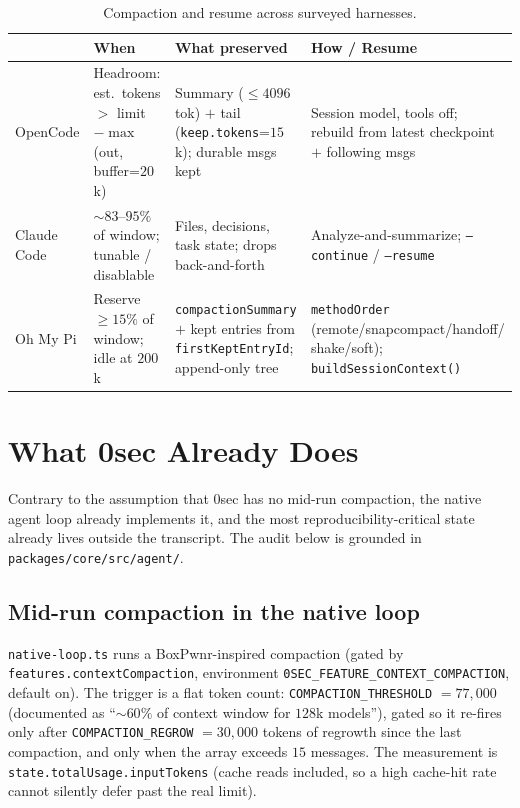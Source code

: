 \documentclass[11pt]{article}
\begin{document}
\begin{table}[t]
\centering
\small
\begin{tabular}{@{}p{2.0cm}p{3.4cm}p{3.4cm}p{3.4cm}@{}}
\toprule
 & \textbf{When} & \textbf{What preserved} & \textbf{How / Resume} \\
\midrule
OpenCode &
Headroom: est.\ tokens $>$ limit $-\max$(out, buffer=$20$k) &
Summary ($\le 4096$ tok) $+$ tail (\texttt{keep.tokens}=$15$k); durable msgs kept &
Session model, tools off; rebuild from latest checkpoint $+$ following msgs \\
\addlinespace
Claude Code &
$\sim 83$--$95\%$ of window; tunable / disablable &
Files, decisions, task state; drops back-and-forth &
Analyze-and-summarize; \texttt{--continue} / \texttt{--resume} \\
\addlinespace
Oh My Pi &
Reserve $\ge 15\%$ of window; idle at $200$k &
\texttt{compactionSummary} $+$ kept entries from \texttt{firstKeptEntryId}; append-only tree &
\texttt{methodOrder} (remote/snapcompact/handoff/ shake/soft); \texttt{buildSessionContext()} \\
\bottomrule
\end{tabular}
\caption{Compaction and resume across surveyed harnesses.}
\label{tab:survey}
\end{table}

\section{What 0sec Already Does}

Contrary to the assumption that 0sec has no mid-run compaction, the native agent
loop already implements it, and the most reproducibility-critical state already
lives outside the transcript. The audit below is grounded in
\texttt{packages/core/src/agent/}.

\subsection{Mid-run compaction in the native loop}

\texttt{native-loop.ts} runs a BoxPwnr-inspired compaction (gated by
\texttt{features.contextCompaction}, environment
\texttt{0SEC\_FEATURE\_CONTEXT\_COMPACTION}, default on). The trigger is a flat
token count: \texttt{COMPACTION\_THRESHOLD} $=77{,}000$ (documented as ``$\sim
60\%$ of context window for $128$k models''), gated so it re-fires only after
\texttt{COMPACTION\_REGROW} $=30{,}000$ tokens of regrowth since the last
compaction, and only when the array exceeds $15$ messages. The measurement is
\texttt{state.totalUsage.inputTokens} (cache reads included, so a high cache-hit
rate cannot silently defer past the real limit).
\end{document}
